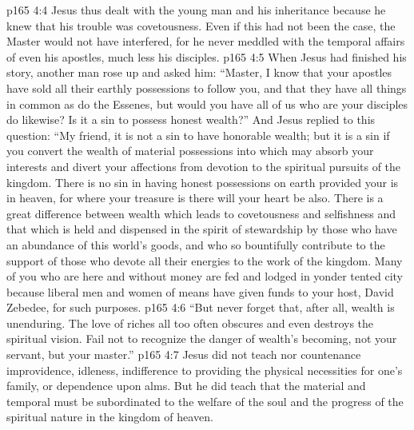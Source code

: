\pc \vs p165 4:4 Jesus thus dealt with the young man and his inheritance because he knew that his trouble was covetousness. Even if this had not been the case, the Master would not have interfered, for he never meddled with the temporal affairs of even his apostles, much less his disciples.
\vs p165 4:5 When Jesus had finished his story, another man rose up and asked him: “Master, I know that your apostles have sold all their earthly possessions to follow you, and that they have all things in common as do the Essenes, but would you have all of us who are your disciples do likewise? Is it a sin to possess honest wealth?” And Jesus replied to this question: \textcolor{ubdarkred}{“My friend, it is not a sin to have honorable wealth; but it is a sin if you convert the wealth of material possessions into  which may absorb your interests and divert your affections from devotion to the spiritual pursuits of the kingdom. There is no sin in having honest possessions on earth provided your  is in heaven, for where your treasure is there will your heart be also. There is a great difference between wealth which leads to covetousness and selfishness and that which is held and dispensed in the spirit of stewardship by those who have an abundance of this world’s goods, and who so bountifully contribute to the support of those who devote all their energies to the work of the kingdom. Many of you who are here and without money are fed and lodged in yonder tented city because liberal men and women of means have given funds to your host, David Zebedee, for such purposes.}\plusone
\vs p165 4:6 \textcolor{ubdarkred}{“But never forget that, after all, wealth is unenduring. The love of riches all too often obscures and even destroys the spiritual vision. Fail not to recognize the danger of wealth’s becoming, not your servant, but your master.”}
\pc \vs p165 4:7 Jesus did not teach nor countenance improvidence, idleness, indifference to providing the physical necessities for one’s family, or dependence upon alms. But he did teach that the material and temporal must be subordinated to the welfare of the soul and the progress of the spiritual nature in the kingdom of heaven.\plusone
